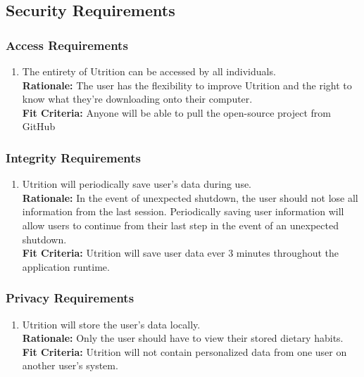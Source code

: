 \documentclass[12pt]{article}
\begin{document}
\subsection{Security Requirements}

\subsubsection{Access Requirements}
\begin{enumerate}[{SR}1. ] 
	\item The entirety of Utrition can be accessed by all individuals. \\
	\textbf{Rationale:} The user has the flexibility to improve Utrition and the right to know what they’re downloading onto their computer.  \\	
	\textbf{Fit Criteria:} Anyone will be able to pull the open-source project from GitHub
\end{enumerate}

\subsubsection{Integrity Requirements}
\begin{enumerate}[{SR}2. ] 
	\item Utrition will periodically save user’s data during use. \\
\textbf{Rationale:} In the event of unexpected shutdown, the user should 
not lose all information from the last session. Periodically saving user 
information will allow users to continue from their last step in the event 
of an unexpected shutdown. \\	
	\textbf{Fit Criteria:} Utrition will save user data ever 3 minutes throughout the 
	application runtime.
\end{enumerate}

\subsubsection{Privacy Requirements}
\begin{enumerate}[{SR}3. ] 
	\item Utrition will store the user’s data locally.\\
	\textbf{Rationale:} Only the user should have to view their stored dietary habits. \\	
	\textbf{Fit Criteria:} Utrition will not contain personalized data from one user on another user's system.
\end{enumerate}
\end{document}
